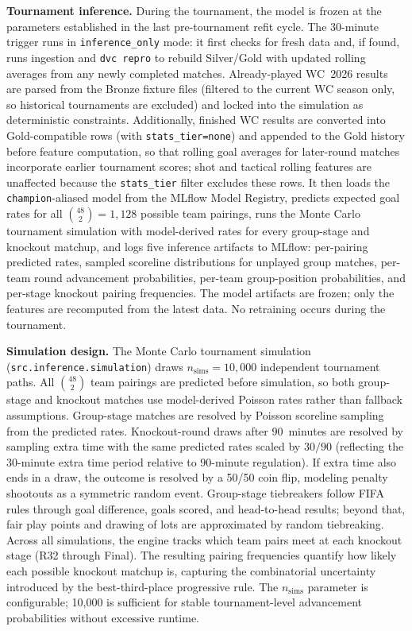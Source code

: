 \documentclass[conference]{IEEEtran}
\begin{document}
\textbf{Tournament inference.}
During the tournament, the model is frozen at the parameters established in
the last pre-tournament refit cycle. The 30-minute trigger runs in
\texttt{inference\_only} mode: it first checks for fresh data and, if found,
runs ingestion and \texttt{dvc repro} to rebuild Silver/Gold with updated
rolling averages from any newly completed matches. Already-played WC~2026
results are parsed from the Bronze fixture files (filtered to the current
WC season only, so historical tournaments are excluded) and locked into
the simulation as deterministic constraints. Additionally, finished WC
results are converted into Gold-compatible rows (with
\texttt{stats\_tier=none}) and appended to the Gold history before
feature computation, so that rolling goal averages for later-round
matches incorporate earlier tournament scores; shot and tactical rolling
features are unaffected because the \texttt{stats\_tier} filter excludes
these rows. It then loads the
\texttt{champion}-aliased model from the MLflow Model Registry, predicts
expected goal rates for all $\binom{48}{2} = 1{,}128$ possible team
pairings, runs the Monte Carlo tournament simulation with model-derived
rates for every group-stage and knockout matchup, and logs five
inference artifacts to MLflow: per-pairing predicted rates, sampled
scoreline distributions for unplayed group matches, per-team round
advancement probabilities, per-team group-position probabilities, and
per-stage knockout pairing frequencies. The model artifacts are frozen;
only the features are recomputed from the latest data.
No retraining occurs during the tournament.

\textbf{Simulation design.}
The Monte Carlo tournament simulation (\texttt{src.inference.simulation})
draws $n_\mathrm{sims} = 10{,}000$ independent tournament paths.
All $\binom{48}{2}$ team pairings are predicted before simulation, so both
group-stage and knockout matches use model-derived Poisson rates rather than
fallback assumptions.
Group-stage matches are resolved by Poisson scoreline sampling from the
predicted rates. Knockout-round draws after 90~minutes are resolved by sampling extra
time with the same predicted rates scaled by $30/90$ (reflecting the
30-minute extra time period relative to 90-minute regulation). If extra time
also ends in a draw, the outcome is resolved by a 50/50 coin flip, modeling
penalty shootouts as a symmetric random event. Group-stage tiebreakers follow
FIFA rules through goal difference, goals scored, and head-to-head results;
beyond that, fair play points and drawing of lots are approximated by random
tiebreaking. Across all simulations, the engine tracks which team pairs
meet at each knockout stage (R32 through Final). The resulting pairing
frequencies quantify how likely each possible knockout matchup is,
capturing the combinatorial uncertainty introduced by the
best-third-place progressive rule. The $n_\mathrm{sims}$ parameter is
configurable; 10{,}000 is sufficient for stable tournament-level
advancement probabilities without excessive runtime.
\end{document}
